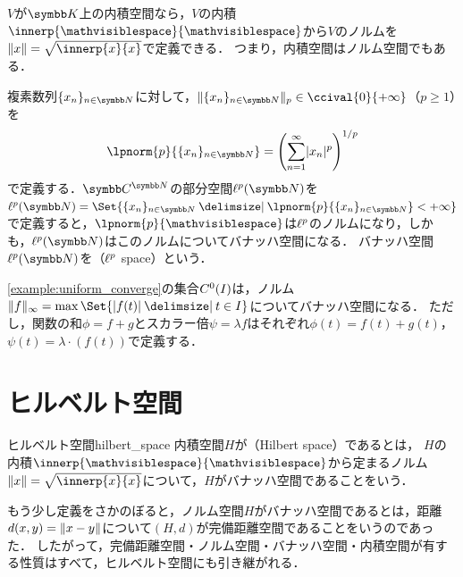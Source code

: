 \documentclass[../../main]{subfiles}
\begin{document}
\begin{example}
  \(V\)が\(\numset{K}\)上の内積空間なら，\(V\)の内積\(\innerp{\holder}{\holder}\)から\(V\)のノルムを\(\vnorm{x}=\sqrt{\innerp{x}{x}}\)で定義できる．
  つまり，内積空間はノルム空間でもある．
\end{example}

\begin{example}[\(\lebesgue{p}\)空間]
  複素数列\(\seq{x_n}_{n\in\numset{N}}\)に対して，\(\vnorm{\seq{x_n}_{n\in\numset{N}}}_p\in\ccival{0}{+\infty}\)（\(p\geq 1\)）を
  \[
    \lpnorm{p}{\seq{x_n}_{n\in\numset{N}}} = \pqty*{\sum_{n=1}^\infty\abs{x_n}^p}^{1/p}
  \]
  で定義する．\(\numset{C}^{\numset{N}}\)の部分空間\(\lebesgue{p}(\numset{N})\)を\(\lebesgue{p}(\numset{N})=\Set{\seq{x_n}_{n\in\numset{N}}\given\lpnorm{p}{\seq{x_n}_{n\in\numset{N}}}<+\infty}\)
  で定義すると，\(\lpnorm{p}{\holder}\)は\(\lebesgue{p}\)のノルムになり，しかも，\(\lebesgue{p}(\numset{N})\)はこのノルムについてバナッハ空間になる．
  バナッハ空間\(\lebesgue{p}(\numset{N})\)を（\(\lebesgue{p}\) space）という．
\end{example}

\begin{example}
  \cref{example:uniform_converge}の集合\(C^0(I)\)は，ノルム\(\vnorm{f}_\infty=\max\Set{\abs{f(t)}\given t\in I}\)についてバナッハ空間になる．
  ただし，関数の和\(\phi=f+g\)とスカラー倍\(\psi=\lambda f\)はそれぞれ\(\phi(t)=f(t)+g(t)\)，\(\psi(t)=\lambda\cdot(f(t))\)で定義する．
\end{example}

\section{ヒルベルト空間}

\begin{definition}{ヒルベルト空間}{hilbert_space}
  内積空間\(H\)が（Hilbert space）であるとは，
  \(H\)の内積\(\innerp{\holder}{\holder}\)から定まるノルム\(\vnorm{x}=\sqrt{\innerp{x}{x}}\)について，\(H\)がバナッハ空間であることをいう．
\end{definition}

もう少し定義をさかのぼると，ノルム空間\(H\)がバナッハ空間であるとは，距離\(d(x,y)=\lVert x-y\rVert\)について\((H,d)\)が完備距離空間であることをいうのであった．
したがって，完備距離空間・ノルム空間・バナッハ空間・内積空間が有する性質はすべて，ヒルベルト空間にも引き継がれる．
\end{document}
